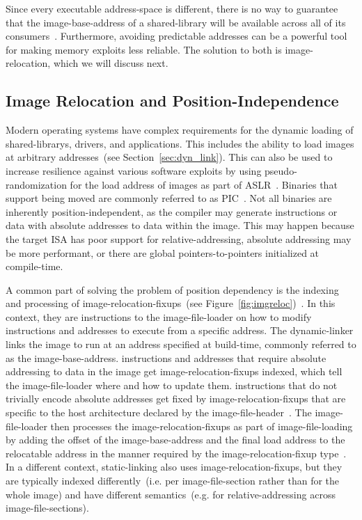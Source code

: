 Since every executable \gls{address-space} is different, there is no way to guarantee that the \gls{image-base-address} of a \gls{shared-library} will be available across all of its consumers~\cite{ms-dll-base-addr}. Furthermore, avoiding predictable addresses can be a powerful tool for making memory exploits less reliable. The solution to both is \gls{image-relocation}, which we will discuss next.

\subsection{Image Relocation and Position-Independence}
\label{sec:reloc}

Modern operating systems have complex requirements for the dynamic loading of \glspl{shared-library}, drivers, and applications. This includes the ability to load \glspl{image} at arbitrary addresses~(see Section~\ref{sec:dyn_link}). This can also be used to increase resilience against various software exploits by using \gls{pseudo-randomization} for the load address of \glspl{image} as part of \gls{ASLR}~\cite{app9142928}. Binaries that support being moved are commonly referred to as \gls{PIC}~\cite{levine2000linkers}. Not all binaries are inherently position-independent, as the compiler may generate  instructions or data with absolute addresses to data within the \gls{image}. This may happen because the target \gls{ISA} has poor support for \gls{relative-addressing}, absolute addressing may be more performant, or there are global pointers-to-pointers initialized at compile-time.

A common part of solving the problem of position dependency is the indexing and processing of \glspl{image-relocation-fixup}~(see Figure~\ref{fig:imgreloc})~\cite{levine2000linkers}. In this context, they are instructions to the \gls{image-file-loader} on how to modify  instructions and addresses to execute from a specific address. The \gls{dynamic-linker} links the \gls{image} to run at an address specified at build-time, commonly referred to as the \gls{image-base-address}.  instructions and addresses that require absolute addressing to data in the \gls{image} get \glspl{image-relocation-fixup} indexed, which tell the \gls{image-file-loader} where and how to update them.  instructions that do not trivially encode absolute addresses get fixed by \glspl{image-relocation-fixup} that are specific to the host architecture declared by the \gls{image-file-header}~\cite{elf-spec,pe-format,arm64-elf}. The \gls{image-file-loader} then processes the \glspl{image-relocation-fixup} as part of \gls{image-file-loading} by adding the offset of the \gls{image-base-address} and the final load address to the relocatable address in the manner required by the \gls{image-relocation-fixup} type~\cite{levine2000linkers}. In a different context, \gls{static-linking} also uses \glspl{image-relocation-fixup}, but they are typically indexed differently~(i.e. per \gls{image-file-section} rather than for the whole \gls{image}) and have different semantics~(e.g. for \gls{relative-addressing} across \glspl{image-file-section}).


